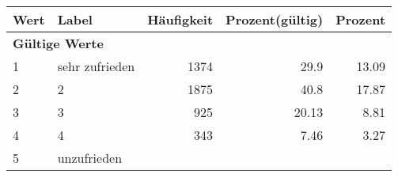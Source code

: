      \begin{longtable}{lXrrr}
     \toprule
     \textbf{Wert} & \textbf{Label} & \textbf{Häufigkeit} & \textbf{Prozent(gültig)} & \textbf{Prozent} \\
     \endhead
     \midrule
     \multicolumn{5}{l}{\textbf{Gültige Werte}}\\

     1 &
     \multicolumn{1}{X}{ sehr zufrieden   } &


       \num{1374} &
       \num[round-mode=places,round-precision=2]{29,9} &
         \num[round-mode=places,round-precision=2]{13,09} \\

     2 &
     \multicolumn{1}{X}{ 2   } &


       \num{1875} &
       \num[round-mode=places,round-precision=2]{40,8} &
         \num[round-mode=places,round-precision=2]{17,87} \\

     3 &
     \multicolumn{1}{X}{ 3   } &


       \num{925} &
       \num[round-mode=places,round-precision=2]{20,13} &
         \num[round-mode=places,round-precision=2]{8,81} \\

     4 &
     \multicolumn{1}{X}{ 4   } &


       \num{343} &
       \num[round-mode=places,round-precision=2]{7,46} &
         \num[round-mode=places,round-precision=2]{3,27} \\

     5 &
     \multicolumn{1}{X}{ unzufrieden   } &



\end{longtable}
